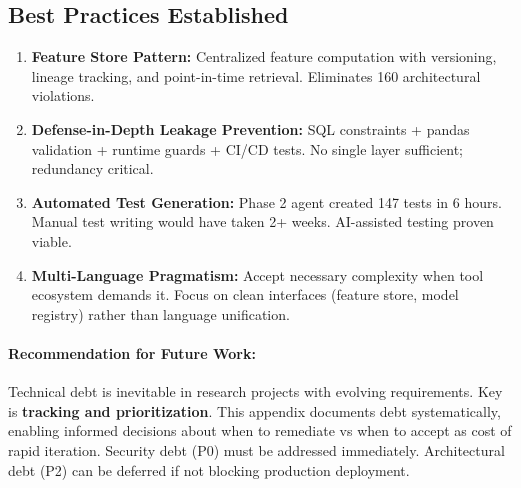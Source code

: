\subsection{Best Practices Established}
\begin{enumerate}
    \item \textbf{Feature Store Pattern:} Centralized feature computation with versioning, lineage tracking, and point-in-time retrieval. Eliminates 160 architectural violations.
    \item \textbf{Defense-in-Depth Leakage Prevention:} SQL constraints + pandas validation + runtime guards + CI/CD tests. No single layer sufficient; redundancy critical.
    \item \textbf{Automated Test Generation:} Phase 2 agent created 147 tests in 6 hours. Manual test writing would have taken 2+ weeks. AI-assisted testing proven viable.
    \item \textbf{Multi-Language Pragmatism:} Accept necessary complexity when tool ecosystem demands it. Focus on clean interfaces (feature store, model registry) rather than language unification.
\end{enumerate}

\paragraph{Recommendation for Future Work:}
Technical debt is inevitable in research projects with evolving requirements. Key is \textbf{tracking and prioritization}. This appendix documents debt systematically, enabling informed decisions about when to remediate vs when to accept as cost of rapid iteration. Security debt (P0) must be addressed immediately. Architectural debt (P2) can be deferred if not blocking production deployment.
